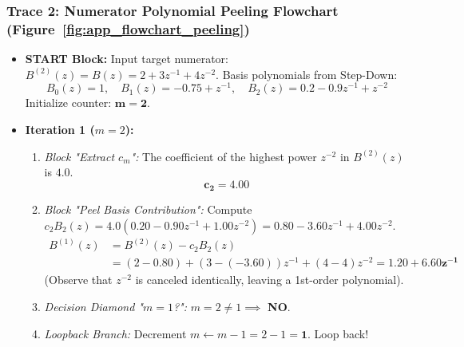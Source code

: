 \documentclass[11pt,a4paper]{article}
\begin{document}
\subsubsection*{Trace 2: Numerator Polynomial Peeling Flowchart (Figure~\ref{fig:app_flowchart_peeling})}
\begin{itemize}
    \item \textbf{START Block:}
    Input target numerator: $B^{(2)}(z) = B(z) = 2 + 3 z^{-1} + 4 z^{-2}$.
    Basis polynomials from Step-Down:
    $$B_0(z) = 1, \quad B_1(z) = -0.75 + z^{-1}, \quad B_2(z) = 0.2 - 0.9 z^{-1} + z^{-2}$$
    Initialize counter: $\mathbf{m = 2}$.

    \item \textbf{Iteration 1 ($m = 2$):}
    \begin{enumerate}
        \item \textit{Block "Extract $c_m$":}
        The coefficient of the highest power $z^{-2}$ in $B^{(2)}(z)$ is $4.0$.
        $$\mathbf{c_2 = 4.00}$$
        \item \textit{Block "Peel Basis Contribution":}
        Compute $c_2 B_2(z) = 4.0(0.20 - 0.90 z^{-1} + 1.00 z^{-2}) = 0.80 - 3.60 z^{-1} + 4.00 z^{-2}$.
        \begin{align}
        B^{(1)}(z) &= B^{(2)}(z) - c_2 B_2(z) \nonumber \\
        &= (2 - 0.80) + (3 - (-3.60)) z^{-1} + (4 - 4) z^{-2} = \mathbf{1.20 + 6.60 z^{-1}}
        \end{align}
        (Observe that $z^{-2}$ is canceled identically, leaving a 1st-order polynomial).
        \item \textit{Decision Diamond "$m = 1$?":}
        $m = 2 \neq 1 \implies$ \textbf{NO}.
        \item \textit{Loopback Branch:} Decrement $m \gets m - 1 = 2 - 1 = \mathbf{1}$. Loop back!
    \end{enumerate}


\end{itemize}
\end{document}
